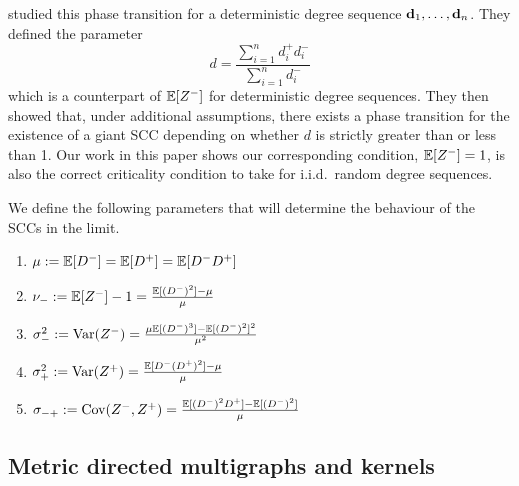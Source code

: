 \citet{cooperSizeLargestStrongly2004} studied this phase transition for a deterministic degree sequence ${\mathbf d}_1, \ldots, {\mathbf d}_n$. They defined the parameter
\begin{equation*}
    d = \frac{\sum_{i=1}^n d_i^+ d_i^-}{\sum_{i=1}^n d_i^-}
\end{equation*}
which is a counterpart of ${\mathbb E}[Z^-]$ for deterministic degree sequences. They then showed that, under additional assumptions, there exists a phase transition for the existence of a giant SCC depending on whether $d$ is strictly greater than or less than 1. Our work in this paper shows our corresponding condition, ${\mathbb E}[Z^-] = 1$, is also the correct criticality condition to take for i.i.d.\ random degree sequences.

We define the following parameters that will determine the behaviour of the SCCs in the limit.
\begin{enumerate}
    \item $\mu:={\mathbb E}[D^-]={\mathbb E}[D^+]={\mathbb E}[D^-D^+]$
    \item $\nu_-:= {\mathbb E}[Z^-] - 1 = \frac{{\mathbb E}[(D^-)^2]-\mu}{\mu}$ 
    \item $\sigma_-^2 := \operatorname{Var}(Z^-) = \frac{\mu{\mathbb E}[(D^-)^3]-{\mathbb E}[(D^-)^2]^2}{\mu^2}$ 
    \item $\sigma_+^2 := \operatorname{Var}(Z^+) = \frac{{\mathbb E}[D^-(D^+)^2]-\mu}{\mu}$ 
    \item $\sigma_{-+} := \operatorname{Cov}(Z^-, Z^+) = \frac{{\mathbb E}[(D^-)^2D^+]-{\mathbb E}[(D^-)^2]}{\mu}$ 
\end{enumerate}
\subsection{Metric directed multigraphs and kernels}\label{subsec.mdmkernels}

